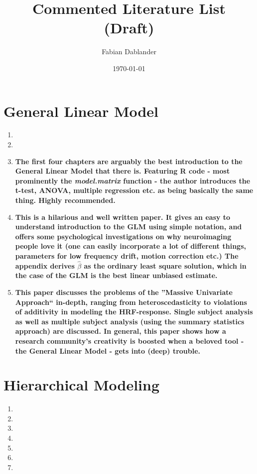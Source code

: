 \documentclass[12pt]{scrartcl}
\title{Commented Literature List \\ (Draft)}
\author{Fabian Dablander}
\date{\today}
\begin{document}
\maketitle

\section{General Linear Model}
\begin{enumerate}[label=-]
  \item {}
  \item {}
  
  \item {}
  
  \textbf{The first four chapters are arguably the best introduction to the General Linear Model that there is. Featuring R code - most prominently the
  \emph{model.matrix} function - the author introduces the t-test, ANOVA, multiple regression etc. as being basically the same thing. Highly recommended.}
  
  
  \item {}
  
  \textbf{This is a hilarious and well written paper. It gives an easy to understand introduction to the GLM using simple notation, and offers some psychological investigations on why neuroimaging people love it (one can easily incorporate a lot of different things, parameters for low frequency drift, motion correction etc.) The appendix derives $\hat{\beta}$ as the ordinary least square solution, which in the case of the GLM is the best linear unbiased estimate.}
  \item {}
  
  \textbf{This paper discusses the problems of the ''Massive Univariate Approach`` in-depth, ranging from heteroscedasticity to violations of additivity in modeling the HRF-response. Single subject analysis as well as multiple subject analysis (using the summary statistics approach) are discussed. In general, this paper shows how a research community's creativity is boosted when a beloved tool - the General Linear Model - gets into (deep) trouble.}
\end{enumerate}

\section{Hierarchical Modeling}
\begin{enumerate}[label=-]
    \item {}
    \item {}
    \item {}
    \item {}
    \item {}
    \item {}
    \item {}
\end{enumerate}
\end{document}
